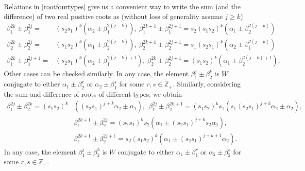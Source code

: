 \documentclass[12pt,reqno]{amsart}
\theoremstyle{plain}
\theoremstyle{definition}
\theoremstyle{remark}
\newcommand\bz{\mathbb Z}
\begin{document}
Relations in \ref{rootfourtypes} give us a convenient way to write the sum (and the difference) of two real positive roots as (without loss of generality assume $j\geq k$) 
\begin{equation}\label{altsumanddiffsame}
    \begin{split}
        \beta_{1}^{2k}\pm\beta_{1}^{2j}=&(s_2s_1)^k(\alpha_2\pm\beta_{1}^{2(j-k)}),\  \beta_{1}^{2k+1}\pm\beta_{1}^{2j+1}=s_2(s_1s_2)^k(\alpha_1\pm\beta_{2}^{2(j-k)})\\
        \beta_{2}^{2k}\pm\beta_{2}^{2j}=&(s_1s_2)^k(\alpha_1\pm\beta_{2}^{2(j-k)}),\  \beta_{2}^{2k+1}\pm\beta_{2}^{2j+1}=s_1(s_2s_1)^k(\alpha_2\pm\beta_{1}^{2(j-k)})\\
        \beta_{1}^{2k}\pm\beta_{1}^{2j+1}=&(s_2s_1)^k(\alpha_2\pm\beta_{1}^{2(j-k)+1}),\  \beta_{2}^{2k}\pm\beta_{2}^{2j+1}=(s_1s_2)^k(\alpha_1\pm\beta_{2}^{2(j-k)+1}),
    \end{split}
\end{equation}
Other cases can be checked similarly. In any case, the element $\beta_1^j\pm\beta_2^k$ is $W$ conjugate to either $\alpha_1\pm\beta_2^r$ or $\alpha_2\pm\beta_1^s$ for some $r,s\in\bz_+.$  Similarly, considering the sum and difference of roots of different types, we obtain 
\begin{equation}\label{altdifftype}
    \begin{split}
        \beta_1^{2j}\pm\beta_2^{2k}=(s_1s_2)^{k}&((s_2s_1)^{j+k}\alpha_2\pm\alpha_1),\ \ \beta_1^{2j}\pm\beta_2^{2k+1}=(s_1s_2)^{k}s_1(s_1(s_2s_1)^{j+k}\alpha_2\pm\alpha_2),\\
        &\beta_1^{2k+1}\pm\beta_2^{2j}=(s_2s_1)^{k}s_2(\alpha_1\pm(s_2s_1)^{j+k}s_2\alpha_1),\\
        &\beta_1^{2k+1}\pm\beta_2^{2j+1}=s_2(s_1s_2)^{k}(\alpha_1\pm(s_2s_1)^{j+k+1}\alpha_2).
    \end{split}
\end{equation}
In any case, the element $\beta_1^j\pm\beta_2^k$ is $W$ conjugate to either $\alpha_1\pm\beta_1^r$ or $\alpha_2\pm\beta_2^s$ for some $r,s\in\bz_+.$
\end{document}
